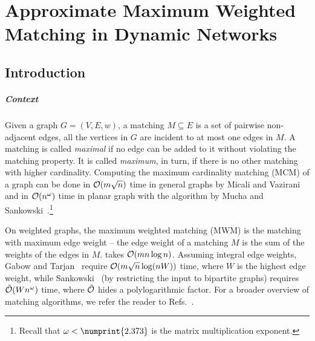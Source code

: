 \chapter{Approximate Maximum Weighted Matching in Dynamic Networks}
\label{ch:dyn-mwm}

\section{Introduction}

\paragraph{Context}
Given a graph $G = (V, E, w)$, a matching $M \subseteq E$ is a set of pairwise
non-adjacent edges,
\ie all the vertices in $G$ are incident to at most one edges in $M$. A
matching is called \emph{maximal} if no edge can be added to it without
violating the matching property. It is called \emph{maximum}, in turn, if there
is no other matching with higher cardinality.
Computing the maximum cardinality matching (MCM) of a graph can be done in
$\mathcal{O}(m\sqrt{n})$ time in general graphs by Micali and
Vazirani~\cite{DBLP:conf/focs/MicaliV80} and in $\mathcal{O}(n^\omega)$ time in planar graph
with the algorithm by Mucha and
Sankowski~\cite{DBLP:journals/algorithmica/MuchaS06}.\footnote{Recall that
$\omega < \numprint{2.373}$ is the matrix multiplication exponent.}

On weighted graphs, the maximum weighted matching (MWM) is the matching
with maximum edge weight -- the edge weight of a matching $M$ is the sum
of the weights of the edges in $M$. 
takes $\mathcal{O}(mn\log n)$.
Assuming integral edge weights, Gabow and Tarjan~\cite{DBLP:journals/jacm/GabowT91}
require $\mathcal{O}(m\sqrt{n}\log(nW))$ time, where $W$ is the highest edge weight,
while Sankowski~\cite{DBLP:journals/tcs/Sankowski09} (by restricting the input to
bipartite graphs) requires $\tilde{\mathcal{O}}(Wn^\omega)$ time, where $\tilde{\mathcal{O}}$
hides a polylogarithmic factor. For a broader overview of matching algorithms,
we refer the reader to
Refs.~\cite{bisseling2020parallel,lawler2001combinatorial,lovasz2009matching}.

